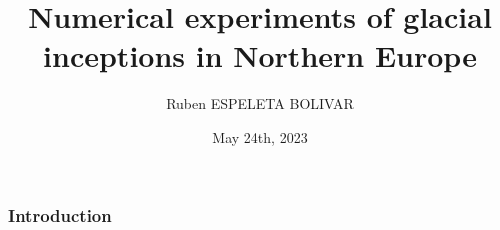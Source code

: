 \documentclass[11pt]{beamer}
\author{Ruben ESPELETA BOLIVAR}
\title{Numerical experiments of glacial inceptions in Northern Europe}
\date{May 24th, 2023}
\begin{document}
	\begin{frame}
		\maketitle
	\end{frame}
	
	\begin{frame}
		\frametitle{Introduction}
	\end{frame}
\end{document}
